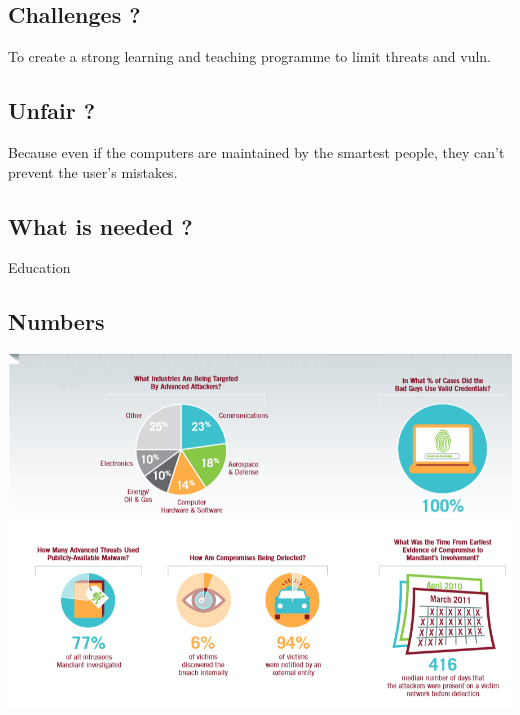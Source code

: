 \documentclass[10pt,a4paper]{article}
\begin{document}
\subsection{Challenges ?}
To create a strong learning and teaching programme to limit threats and vuln.\\
\subsection{Unfair ?}
Because even if the computers are maintained by the smartest people, they can't prevent the user's mistakes.
\subsection{What is needed ?}
Education
\subsection{Numbers}
\includegraphics[scale=0.55]{1_numbers.png}\\
\end{document}
